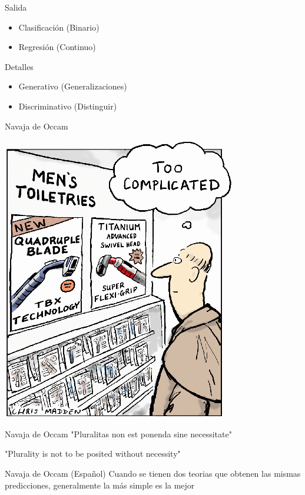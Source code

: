 \documentclass{beamer}
\begin{document}
\begin{frame}{Salida}
    \begin{itemize}
        \item Clasificación (Binario)
        \item Regresión (Continuo)
    \end{itemize}
\end{frame}

\begin{frame}{Detalles}
    \begin{itemize}
        \item Generativo (Generalizaciones)
        \item Discriminativo (Distinguir)
    \end{itemize}
\end{frame}

\begin{frame}{Navaja de Occam}
    \begin{center}
        \includegraphics[width=0.7\linewidth]{Images/occam}
    \end{center}
\end{frame}

\begin{frame}{Navaja de Occam}
    "Pluralitas non est ponenda sine necessitate"
    
    "Plurality is not to be posited without necessity"
\end{frame}

\begin{frame}{Navaja de Occam (Español)}
    Cuando se tienen dos teorias que obtenen las mismas predicciones, generalmente la más simple es la mejor
\end{frame}
\end{document}
